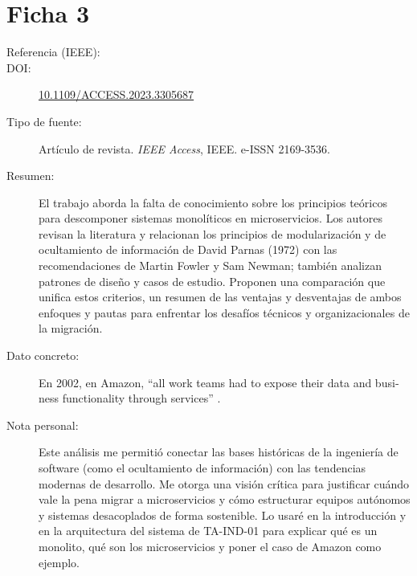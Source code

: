 \documentclass[11pt,a4paper]{article}
\newcommand{\doi}[1]{\href{https://doi.org/#1}{#1}}
\begin{document}
\section{Ficha 3}
\begin{description}
  \item[Referencia (IEEE):] 
  \item[DOI:] \doi{10.1109/ACCESS.2023.3305687}
  \item[Tipo de fuente:] Artículo de revista. \emph{IEEE Access}, IEEE. e-ISSN 2169-3536.
  \item[Resumen:] El trabajo aborda la falta de conocimiento sobre los principios teóricos para descomponer sistemas monolíticos en microservicios. Los autores revisan la literatura y relacionan los principios de modularización y de ocultamiento de información de David Parnas (1972) con las recomendaciones de Martin Fowler y Sam Newman; también analizan patrones de diseño y casos de estudio. Proponen una comparación que unifica estos criterios, un resumen de las ventajas y desventajas de ambos enfoques y pautas para enfrentar los desafíos técnicos y organizacionales de la migración.
  \item[Dato concreto:] En 2002, en Amazon, \foreignquote{american}{all work teams had to expose their data and business functionality through services} \cite[Sec.~V-A, p.~88355]{velepucha2023}.
  \item[Nota personal:] Este análisis me permitió conectar las bases históricas de la ingeniería de software (como el ocultamiento de información) con las tendencias modernas de desarrollo. Me otorga una visión crítica para justificar cuándo vale la pena migrar a microservicios y cómo estructurar equipos autónomos y sistemas desacoplados de forma sostenible. Lo usaré en la introducción y en la arquitectura del sistema de TA-IND-01 para explicar qué es un monolito, qué son los microservicios y poner el caso de Amazon como ejemplo.
\end{description}
\end{document}
